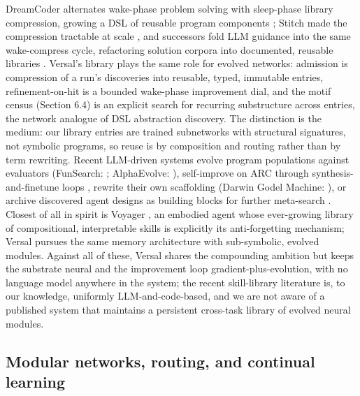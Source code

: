 \documentclass[11pt]{article}
\begin{document}
DreamCoder alternates wake-phase problem solving with sleep-phase library compression, growing a DSL of reusable program components \citep{ellis2021}; Stitch made the compression tractable at scale \citep{bowers2023}, and successors fold LLM guidance into the same wake-compress cycle, refactoring solution corpora into documented, reusable libraries \citep{grand2024, stengeleskin2024}. Versal's library plays the same role for evolved networks: admission is compression of a run's discoveries into reusable, typed, immutable entries, refinement-on-hit is a bounded wake-phase improvement dial, and the motif census (Section 6.4) is an explicit search for recurring substructure across entries, the network analogue of DSL abstraction discovery. The distinction is the medium: our library entries are trained subnetworks with structural signatures, not symbolic programs, so reuse is by composition and routing rather than by term rewriting. Recent LLM-driven systems evolve program populations against evaluators (FunSearch: \citealp{romeraparedes2024}; AlphaEvolve: \citealp{novikov2025}), self-improve on ARC through synthesis-and-finetune loops \citep{pourcel2025}, rewrite their own scaffolding (Darwin Godel Machine: \citealp{zhang2025dgm}), or archive discovered agent designs as building blocks for further meta-search \citep{hu2025}. Closest of all in spirit is Voyager \citep{wang2023voyager}, an embodied agent whose ever-growing library of compositional, interpretable skills is explicitly its anti-forgetting mechanism; Versal pursues the same memory architecture with sub-symbolic, evolved modules. Against all of these, Versal shares the compounding ambition but keeps the substrate neural and the improvement loop gradient-plus-evolution, with no language model anywhere in the system; the recent skill-library literature is, to our knowledge, uniformly LLM-and-code-based, and we are not aware of a published system that maintains a persistent cross-task library of evolved neural modules.

\subsection{Modular networks, routing, and continual learning}
\end{document}
